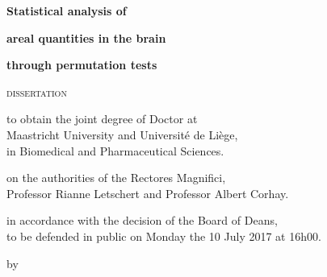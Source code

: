\pagestyle{empty}
\vspace*{3cm}
\vspace*{\fill}
\begin{center}
\begin{Huge}
\textbf{Statistical analysis of}
\end{Huge}

\vspace{2mm}

\begin{Huge}
\textbf{areal quantities in the brain}
\end{Huge}

\vspace{2mm}

\begin{Huge}
\textbf{through permutation tests}
\end{Huge}
\end{center}

\vfill

\begin{center}
\textsc{dissertation}

\vfill

to obtain the joint degree of Doctor at\\
Maastricht University and Universit\'{e} de Li\`{e}ge,\\
in Biomedical and Pharmaceutical Sciences.

\vfill

on the authorities of the Rectores Magnifici,\\
Professor Rianne Letschert and Professor Albert Corhay.

\vfill

in accordance with the decision of the Board of Deans,\\
to be defended in public on Monday the 10 July 2017 at 16h00.

\vfill

by
\end{center}


